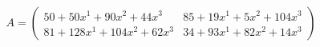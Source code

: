 \documentclass[preview]{standalone}
\begin{document}
\begin{align*}
A = \begin{pmatrix}50 + 50x^{1} + 90x^{2} + 44x^{3} & 85 + 19x^{1} + 5x^{2} + 104x^{3} \\ 81 + 128x^{1} + 104x^{2} + 62x^{3} & 34 + 93x^{1} + 82x^{2} + 14x^{3}\end{pmatrix}
\end{align*}
\end{document}
